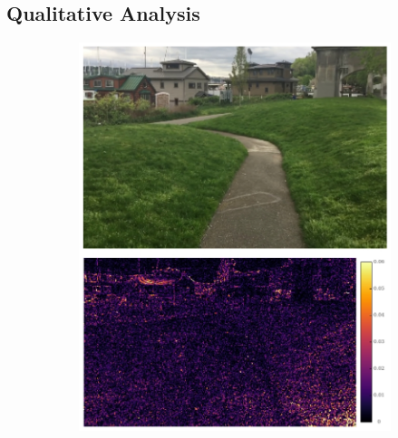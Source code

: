 \documentclass{article}
\begin{document}
\subsection{Qualitative Analysis}
\label{sec_qua}
\begin{figure}
\centering
\begin{subfigure}{0.25\textwidth}
	\centering
    \includegraphics[width=1\linewidth]{qua_imgs/720p_240fps_1_ours.jpg}


\end{subfigure}
\end{figure}
\end{document}
